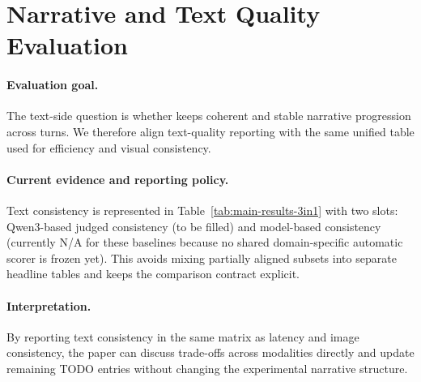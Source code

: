 \section{Narrative and Text Quality Evaluation}
\label{sec:narrative-quality}

\paragraph{Evaluation goal.}
The text-side question is whether \dn keeps coherent and stable narrative progression across turns. We therefore align text-quality reporting with the same unified table used for efficiency and visual consistency.

\paragraph{Current evidence and reporting policy.}
Text consistency is represented in Table~\ref{tab:main-results-3in1} with two slots: Qwen3-based judged consistency (to be filled) and model-based consistency (currently N/A for these baselines because no shared domain-specific automatic scorer is frozen yet). This avoids mixing partially aligned subsets into separate headline tables and keeps the comparison contract explicit.

\paragraph{Interpretation.}
By reporting text consistency in the same matrix as latency and image consistency, the paper can discuss trade-offs across modalities directly and update remaining TODO entries without changing the experimental narrative structure.
